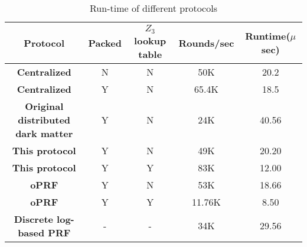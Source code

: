 \begin{table}[htbp]
	\begin{center}
		\begin{tabular}{|c|c|c|c|c|}
			\hline
			\textbf{Protocol} & \textbf{Packed }  &  \textbf{$Z_3$ lookup table} & \textbf{Rounds/sec} & Runtime($\mu$ sec)\\
			\hline
			\hline
			\textbf{Centralized}  & N  & N  &  50K&	20.2 \\
			\hline
			\textbf{Centralized} & Y  &  N & 65.4K &	18.5 \\
			\hline
			\textbf{Original distributed dark matter} & Y	& N &  24K & 40.56	\\
			\hline
			\textbf{This protocol} & Y & N &	49K &  20.20\\
			\hline
			\textbf{This protocol} & Y & Y & 83K &  12.00	\\
			\hline
			\textbf{oPRF} & Y & N & 53K &  18.66	\\
			\hline
			\textbf{oPRF} & Y & Y & 11.76K &  8.50	\\
			\hline
			\textbf{Discrete log-based PRF} &  - & - & 34K & 29.56 \\
			\hline
			
		\end{tabular}
		
		\vspace{-1mm}
		\caption{Run-time of different protocols}
		\label{RuntimeTable}
	\end{center}
	\vspace{-5mm}
\end{table}







